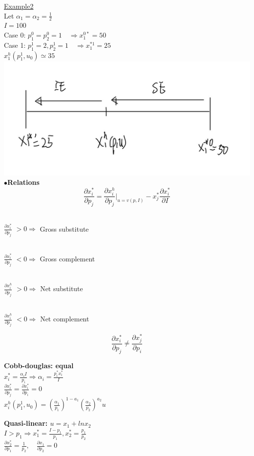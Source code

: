 \documentclass[letterpaper,13pt,single,pdftex]{scrartcl}
\begin{document}
\underline{Example2}\\
Let $\alpha_1 = \alpha_2 = \frac{1}{2}$\\
$I =100$\\
Case 0: $p_1^0 = p_2^0 = 1 \quad \Rightarrow x_1^{0*} = 50$ \\
Case 1: $p_1^1 = 2, p_2^1 = 1 \quad \Rightarrow x_1^{*1} = 25$\\
$x_1^h(p_1^1, u_0)  \simeq 35 $\\
\includegraphics[scale = 0.2]{example-1.jpg}\\
$\bullet $\textbf{Relations}
\[\frac{\partial x_i^*}{\partial p_j} = \frac{\partial x^h_i}{\partial p_j} |_{u = v(p,I)} - x_j^* \frac{\partial x_i^*}{\partial I}\]

\\ $\frac{\partial x_i^*}{\partial p_j}$
 $>0 \Rightarrow$ Gross substitute

\\ $\frac{\partial x_i^*}{\partial p_j}$ $<0 \Rightarrow$ Gross complement

\\ $\frac{\partial x_i^h}{\partial p_j} $
$ >0 \Rightarrow$ Net substitute

\\ $\frac{\partial x_i^h}{\partial p_j}$ $ <0 \Rightarrow$ Net complement

\[\frac{\partial x_i^*}{\partial p_j} \ne \frac{\partial x_j^*}{\partial p_i}\]
\par \textbf{Cobb-douglas: equal}\\
$x_i^* = \frac{\alpha_i I}{p_i} \Rightarrow \alpha_i = \frac{p_i^*x_i^*}{I}$\\
 $\frac{\partial x^*_i}{\partial p_j} = \frac{\partial x_i^*}{\partial p_i}=0$\\
 $x_i^h(p_1^1,u_0) = (\frac{\alpha_1}{p_1})^{1-a_1}(\frac{\alpha_2}{p_2})^{a_2}u$
\par \textbf{\latex Quasi-linear: $ u = x_1 + lnx_2 $}\\
$I >p_1 \Rightarrow x_1^* = \frac{I-p_1}{p_1}, x_2^* = \frac{p_1}{p_2}$\\
 $\frac{\partial x_2^*}{\partial p_1} = \frac{1}{p_2}, \quad \frac{\partial x_1}{\partial p_2} = 0$
\end{document}
